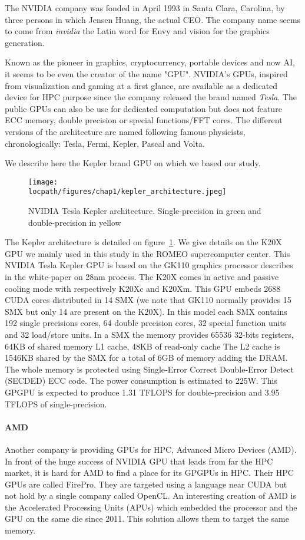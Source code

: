 The NVIDIA company was fonded in April 1993 in Santa Clara, Carolina, by three persons in which Jensen Huang, the actual CEO.
The company name seems to come from \textit{invidia} the Latin word for Envy and vision for the graphics generation. 

Known as the pioneer in graphics, cryptocurrency, portable devices and now AI, it seems to be even the creator of the name "GPU".
NVIDIA's GPUs, inspired from visualization and gaming at a first glance, are available as a dedicated device for HPC purpose since the company released the brand named \textit{Tesla}. 
The public GPUs can also be use for dedicated computation but does not feature ECC memory, double precision or special functions/FFT cores. 
The different versions of the architecture are named following famous physicists, chronologically: Tesla, Fermi, Kepler, Pascal and Volta. 

We describe here the Kepler brand GPU on which we based our study. 
\begin{figure}
\centering
\texttt{[image: \\locpath/figures/chap1/kepler\_architecture.jpeg]}
\caption{NVIDIA Tesla Kepler architecture. Single-precision in green and double-precision in yellow}
\label{fig:2_HARD:kepler_arch}
\end{figure}
The Kepler architecture is detailed on figure~\ref{fig:2_HARD:kepler_arch}.
We give details on the K20X GPU we mainly used in this study in the ROMEO supercomputer center. 
This NVIDIA Tesla Kepler GPU is based on the GK110 graphics processor describes in the white-paper\cite{nvidia2012nvidias} on 28nm process.
The K20X comes in active and passive cooling mode with respectively K20Xc and K20Xm.
This GPU embeds 2688 CUDA cores distributed in 14 SMX (we note that GK110 normally provides 15 SMX but only 14 are present  on the K20X).
In this model each SMX contains 192 single precisions cores, 64 double precision cores, 32 special function units and 32 load/store units.
In a SMX the memory provides 65536 32-bits registers, 64KB of shared memory L1 cache, 48KB of read-only cache
The L2 cache is 1546KB shared by the SMX for a total of 6GB of memory adding the DRAM.
The whole memory is protected using Single‐Error Correct Double‐Error Detect (SECDED) ECC code.
The power consumption is estimated to 225W.
This GPGPU is expected to produce 1.31 TFLOPS for double-precision and 3.95 TFLOPS of single-precision.

\paragraph{AMD}
Another company is providing GPUs for HPC, Advanced Micro Devices (AMD). 
In front of the huge success of NVIDIA GPU that leads from far the HPC market, it is hard for AMD to find a place for its GPGPUs in HPC. 
Their HPC GPUs are called FirePro.
They are targeted using a language near CUDA but not hold by a single company called OpenCL. 
An interesting creation of AMD is the Accelerated Processing Units (APUs) which embedded the processor and the GPU on the same die since 2011. 
This solution allows them to target the same memory. 

